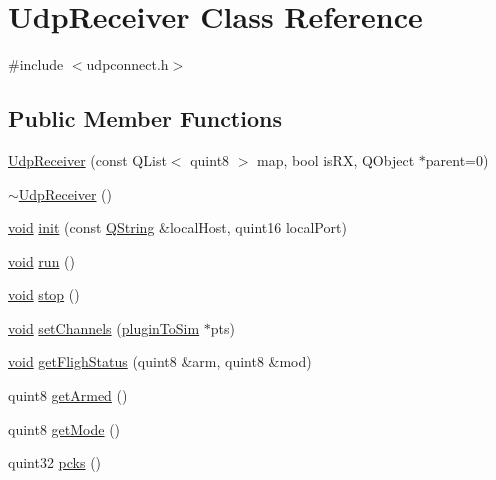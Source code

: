 \hypertarget{class_udp_receiver}{\section{\-Udp\-Receiver \-Class \-Reference}
\label{class_udp_receiver}
}


{\ttfamily \#include $<$udpconnect.\-h$>$}

\subsection*{\-Public \-Member \-Functions}
\begin{DoxyCompactItemize}
\item 
\hyperlink{group___aero_sim_r_c_ga1a7699c1e29a1d7ee129c5aeecc515c5}{\-Udp\-Receiver} (const \-Q\-List$<$ quint8 $>$ map, bool is\-R\-X, \-Q\-Object $\ast$parent=0)
\item 
\hyperlink{group___aero_sim_r_c_ga7125fcfef5ec56da34e1f3f2afc21c57}{$\sim$\-Udp\-Receiver} ()
\item 
\hyperlink{group___u_a_v_objects_plugin_ga444cf2ff3f0ecbe028adce838d373f5c}{void} \hyperlink{group___aero_sim_r_c_gad45fd7a1310445a52d17f2fe3ec7ab4b}{init} (const \hyperlink{group___u_a_v_objects_plugin_gab9d252f49c333c94a72f97ce3105a32d}{\-Q\-String} \&local\-Host, quint16 local\-Port)
\item 
\hyperlink{group___u_a_v_objects_plugin_ga444cf2ff3f0ecbe028adce838d373f5c}{void} \hyperlink{group___aero_sim_r_c_gaa4efe37e6d2da77ba95eb22705c1f1e2}{run} ()
\item 
\hyperlink{group___u_a_v_objects_plugin_ga444cf2ff3f0ecbe028adce838d373f5c}{void} \hyperlink{group___aero_sim_r_c_ga6269b9d1dd9625c71d9749c343e6be17}{stop} ()
\item 
\hyperlink{group___u_a_v_objects_plugin_ga444cf2ff3f0ecbe028adce838d373f5c}{void} \hyperlink{group___aero_sim_r_c_gab9cfcf389004c47e3af049bcef67fed9}{set\-Channels} (\hyperlink{structplugin_to_sim}{plugin\-To\-Sim} $\ast$pts)
\item 
\hyperlink{group___u_a_v_objects_plugin_ga444cf2ff3f0ecbe028adce838d373f5c}{void} \hyperlink{group___aero_sim_r_c_ga7aa237515699baba97a4c3e76a55d401}{get\-Fligh\-Status} (quint8 \&arm, quint8 \&mod)
\item 
quint8 \hyperlink{group___aero_sim_r_c_gaf0d473076876c13ba7df05e9ba6fd322}{get\-Armed} ()
\item 
quint8 \hyperlink{group___aero_sim_r_c_gaf1ad345905414c2c6c8883cdba472aae}{get\-Mode} ()
\item 
quint32 \hyperlink{group___aero_sim_r_c_ga4b48a3aa9531a445286790d5859da129}{pcks} ()
\end{DoxyCompactItemize}


